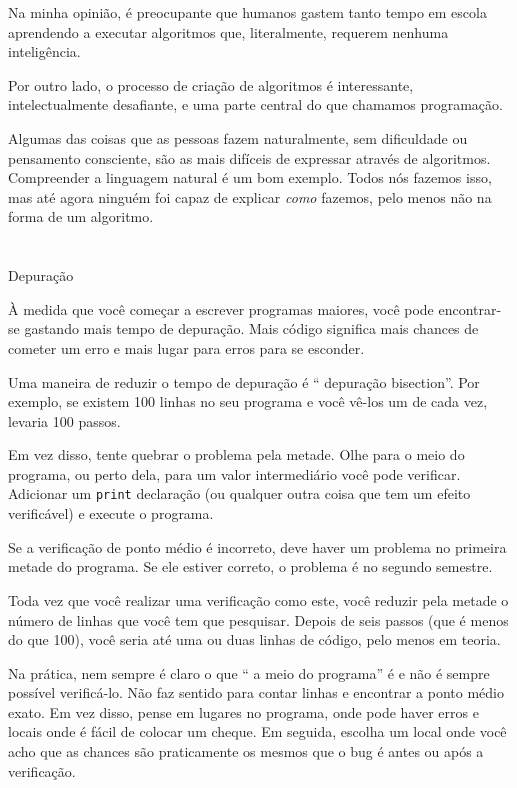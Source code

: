 \documentclass[10pt]{book}
\begin{document}
{Na minha opinião, é preocupante que humanos gastem tanto tempo em
escola aprendendo a executar algoritmos que, literalmente, requerem
nenhuma inteligência.

Por outro lado, o processo de criação de algoritmos é interessante,
intelectualmente desafiante, e uma parte central do que chamamos
programação.

Algumas das coisas que as pessoas fazem naturalmente, sem dificuldade ou
pensamento consciente, são as mais difíceis de expressar através de algoritmos.
Compreender a linguagem natural é um bom exemplo. Todos nós fazemos isso, mas
até agora ninguém foi capaz de explicar {\em como} fazemos, pelo menos
não na forma de um algoritmo.


\section{} Depuração

À medida que você começar a escrever programas maiores, você pode encontrar-se
gastando mais tempo de depuração. Mais código significa mais chances de
cometer um erro e mais lugar para erros para se esconder.

Uma maneira de reduzir o tempo de depuração é `` depuração bisection''.
Por exemplo, se existem 100 linhas no seu programa e você
vê-los um de cada vez, levaria 100 passos.

Em vez disso, tente quebrar o problema pela metade. Olhe para o meio
do programa, ou perto dela, para um valor intermediário você
pode verificar. Adicionar um {\tt print} declaração (ou qualquer outra coisa
que tem um efeito verificável) e execute o programa.

Se a verificação de ponto médio é incorreto, deve haver um problema no
primeira metade do programa. Se ele estiver correto, o problema é
no segundo semestre.

Toda vez que você realizar uma verificação como este, você reduzir pela metade o número de
linhas que você tem que pesquisar. Depois de seis passos (que é menos do que 100),
você seria até uma ou duas linhas de código, pelo menos em teoria.

Na prática, nem sempre é claro o que
`` a meio do programa'' é e não é sempre possível
verificá-lo. Não faz sentido para contar linhas e encontrar a
ponto médio exato. Em vez disso, pense em lugares
no programa, onde pode haver erros e locais onde
é fácil de colocar um cheque. Em seguida, escolha um local onde você
acho que as chances são praticamente os mesmos que o bug é antes
ou após a verificação.




}
\end{document}
